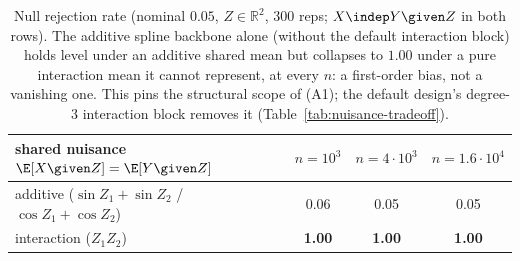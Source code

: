 \begin{table}[ht]\centering
\begin{tabular}{lccc}
\toprule
shared nuisance $\E[X\given Z]=\E[Y\given Z]$ & $n=10^3$ & $n=4{\cdot}10^3$ & $n=1.6{\cdot}10^4$ \\
\midrule
additive ($\sin Z_1+\sin Z_2$ / $\cos Z_1+\cos Z_2$) & 0.06 & 0.05 & 0.05 \\
interaction ($Z_1 Z_2$) & \textbf{1.00} & \textbf{1.00} & \textbf{1.00} \\
\bottomrule
\end{tabular}
\caption{Null rejection rate (nominal $0.05$, $Z\in\mathbb{R}^2$, $300$ reps; $X\indep Y\given Z$ in both rows). The additive spline backbone alone (without the default interaction block) holds level under an additive shared mean but collapses to $1.00$ under a pure interaction mean it cannot represent, at every $n$: a first-order bias, not a vanishing one. This pins the structural scope of (A1); the default design's degree-3 interaction block removes it (Table~\ref{tab:nuisance-tradeoff}).}
\label{tab:interaction}
\end{table}
